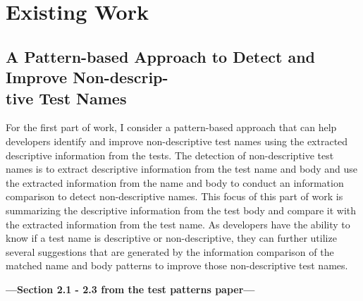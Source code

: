 \section{Existing Work}
\subsection{A Pattern-based Approach to Detect and Improve Non-descrip-\\tive Test Names}
\label{sec:test-pattern-section}

For the first part of work, I consider a pattern-based approach that can help developers identify and improve non-descriptive test names using the extracted descriptive information from the tests.
%
The detection of non-descriptive test names is to extract descriptive information from the test name and body and use the extracted information  from the name and body to conduct an information comparison to detect non-descriptive names.
%
This focus of this part of work is summarizing the descriptive information from the test body and compare it with the extracted information from the test name.
%
As developers have the ability to know if a test name is descriptive or non-descriptive, they can further utilize several suggestions that are generated by the information comparison of the matched name and body patterns to improve those non-descriptive test names.

\textbf{---Section 2.1 - 2.3 from the test patterns paper---}





